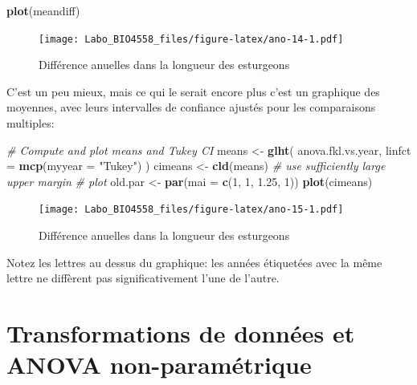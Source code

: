 \documentclass[
  12pt,
]{book}
\newenvironment{Shaded}{\begin{snugshade}}{\end{snugshade}}
\newcommand{\CommentTok}[1]{\textcolor[rgb]{0.56,0.35,0.01}{\textit{#1}}}
\newcommand{\DataTypeTok}[1]{\textcolor[rgb]{0.13,0.29,0.53}{#1}}
\newcommand{\DecValTok}[1]{\textcolor[rgb]{0.00,0.00,0.81}{#1}}
\newcommand{\FloatTok}[1]{\textcolor[rgb]{0.00,0.00,0.81}{#1}}
\newcommand{\KeywordTok}[1]{\textcolor[rgb]{0.13,0.29,0.53}{\textbf{#1}}}
\newcommand{\NormalTok}[1]{#1}
\newcommand{\StringTok}[1]{\textcolor[rgb]{0.31,0.60,0.02}{#1}}
\begin{document}
\begin{Shaded}
\begin{Highlighting}[]
\KeywordTok{plot}\NormalTok{(meandiff)}
\end{Highlighting}
\end{Shaded}

\begin{figure}
\centering
\texttt{[image: Labo\_BIO4558\_files/figure-latex/ano-14-1.pdf]}
\caption{\label{fig:ano-14}Différence anuelles dans la longueur des esturgeons}
\end{figure}

C'est un peu mieux, mais ce qui le serait encore plus c'est un graphique des moyennes, avec leurs intervalles de confiance ajustés pour les comparaisons multiples:

\begin{Shaded}
\begin{Highlighting}[]
\CommentTok{\# Compute and plot means and Tukey CI}
\NormalTok{means \textless{}{-}}\StringTok{ }\KeywordTok{glht}\NormalTok{(}
\NormalTok{  anova.fkl.vs.year,}
  \DataTypeTok{linfct =} \KeywordTok{mcp}\NormalTok{(}\DataTypeTok{myyear =} \StringTok{"Tukey"}\NormalTok{)}
\NormalTok{)}
\NormalTok{cimeans \textless{}{-}}\StringTok{ }\KeywordTok{cld}\NormalTok{(means)}
\CommentTok{\# use sufficiently large upper margin}
\CommentTok{\# plot}
\NormalTok{old.par \textless{}{-}}\StringTok{ }\KeywordTok{par}\NormalTok{(}\DataTypeTok{mai =} \KeywordTok{c}\NormalTok{(}\DecValTok{1}\NormalTok{, }\DecValTok{1}\NormalTok{, }\FloatTok{1.25}\NormalTok{, }\DecValTok{1}\NormalTok{))}
\KeywordTok{plot}\NormalTok{(cimeans)}
\end{Highlighting}
\end{Shaded}

\begin{figure}
\centering
\texttt{[image: Labo\_BIO4558\_files/figure-latex/ano-15-1.pdf]}
\caption{\label{fig:ano-15}Différence anuelles dans la longueur des esturgeons}
\end{figure}

Notez les lettres au dessus du graphique: les années étiquetées avec la même lettre ne diffèrent pas significativement l'une de l'autre.

\hypertarget{transformations-de-donnuxe9es-et-anova-non-paramuxe9trique}{%
\section{Transformations de données et ANOVA non-paramétrique}\label{transformations-de-donnuxe9es-et-anova-non-paramuxe9trique}}
\end{document}
